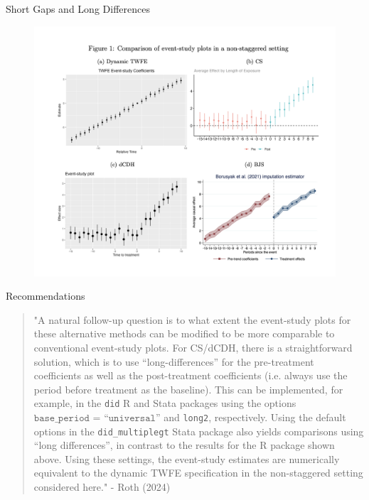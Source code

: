 \documentclass{beamer}
\begin{document}
\begin{frame}{Short Gaps and Long Differences}

\begin{figure}[h]
    \centering
    \includegraphics[width=\linewidth, height=0.8\textheight, keepaspectratio]{./lecture_includes/shortgap}
\end{figure}

\end{frame}

\begin{frame}{Recommendations}

\begin{quote}
"A natural follow-up question is to what extent the event-study plots for these alternative methods can be modified to be more comparable to conventional event-study plots. For CS/dCDH, there is a straightforward solution, which is to use “long-diﬀerences” for the pre-treatment coeﬃcients as well as the post-treatment coeﬃcients (i.e. always use the period before treatment as the baseline). This can be implemented, for example, in the \texttt{did} R and Stata packages using the options $\texttt{base_period = “universal”}$ and \texttt{long2}, respectively.  Using the default options in the \texttt{did_multiplegt} Stata package also yields comparisons using “long diﬀerences”, in contrast to the results for the R package shown above. Using these settings, the event-study estimates are numerically equivalent to the dynamic TWFE specification in the non-staggered setting considered here." - Roth (2024)
\end{quote}

\end{frame}
\end{document}
